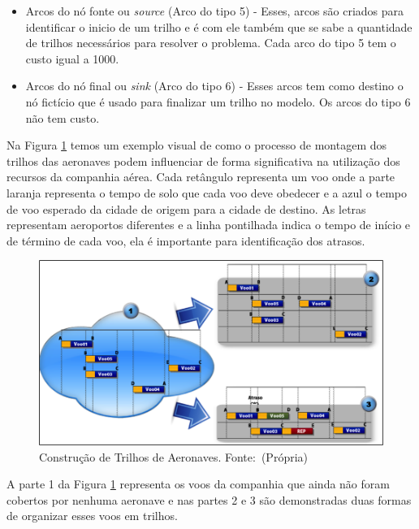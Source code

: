 \begin{itemize}
\begin{figure}[ht]
\end{figure}

\item Arcos do nó fonte ou \textit{source} (Arco do tipo 5) - Esses, arcos são
criados para identificar o inicio de um trilho e é com ele também que se sabe a
quantidade de trilhos necessários para resolver o problema. Cada arco do tipo 5
tem o custo igual a 1000.

\item Arcos do nó final ou \textit{sink} (Arco do tipo 6) - Esses arcos tem
como destino o nó fictício que é usado para finalizar um trilho no modelo. Os
arcos do tipo 6 não tem custo.

\end{itemize}

Na Figura \ref{fig:arpexample} temos um exemplo visual de como o processo de 
montagem dos trilhos das aeronaves podem influenciar de forma significativa na
utilização dos recursos da companhia aérea. Cada retângulo representa um voo
onde a parte laranja representa o tempo de solo que cada voo deve obedecer e a
azul o tempo de voo esperado da cidade de origem para a cidade de destino. As
letras representam aeroportos diferentes e a linha pontilhada indica o tempo de
início e de término de cada voo, ela é importante para identificação dos
atrasos.

\begin{figure}[ht]
	\caption{Construção de Trilhos de Aeronaves. \newline \mbox{Fonte: (Própria)}}
	\label{fig:arpexample}
	\includegraphics[scale=0.6]{./img/arpexample}
\end{figure}

A parte 1 da Figura \ref{fig:arpexample} representa os voos da companhia que
ainda não foram cobertos por nenhuma aeronave e nas partes 2 e 3 são
demonstradas duas formas de organizar esses voos em trilhos. 

